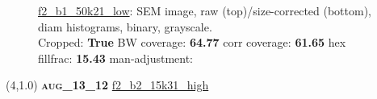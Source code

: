 \begin{figure}[h!]
\label{semimg26}
\caption*{\hyperlink{covtableaug_13_12}{\color{blue} \small \ttfamily f2\_b1\_50k21\_low}: SEM image, raw (top)/size-corrected (bottom), diam histograms, binary, grayscale.\\Cropped: {\bf True} \;\; BW coverage: {\bf 64.77} \:\: corr coverage: {\bf 61.65} \:\: hex fillfrac: {\bf 15.43} \:\: man-adjustment: {\bf \color{blue}{Yes}}}
\end{figure}
\newpage

\begin{textblock}{5}(4,1.0)
{\bf \textsc{aug\_13\_12}}
\hspace{4.5cm}
\hyperlink{covtableaug_13_12}{\color{blue} \large \ttfamily f2\_b2\_15k31\_high}
\end{textblock}

